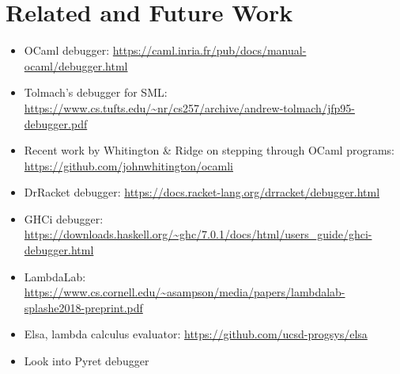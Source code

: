 \newcommand{\relatedWorkSection}{Related and Future Work}
\section{\relatedWorkSection} %
\label{sec:relatedWork}

\begin{itemize}
\item OCaml debugger: \url{https://caml.inria.fr/pub/docs/manual-ocaml/debugger.html}
\item Tolmach's debugger for SML: \url{https://www.cs.tufts.edu/~nr/cs257/archive/andrew-tolmach/jfp95-debugger.pdf}
\item Recent work by Whitington \& Ridge on stepping through OCaml programs: \url{https://github.com/johnwhitington/ocamli}
\item DrRacket debugger: \url{https://docs.racket-lang.org/drracket/debugger.html}
\item GHCi debugger: \url{https://downloads.haskell.org/~ghc/7.0.1/docs/html/users_guide/ghci-debugger.html}
\item LambdaLab: \url{https://www.cs.cornell.edu/~asampson/media/papers/lambdalab-splashe2018-preprint.pdf}
\item Elsa, lambda calculus evaluator: \url{https://github.com/ucsd-progsys/elsa}
\item Look into Pyret debugger
\end{itemize}

